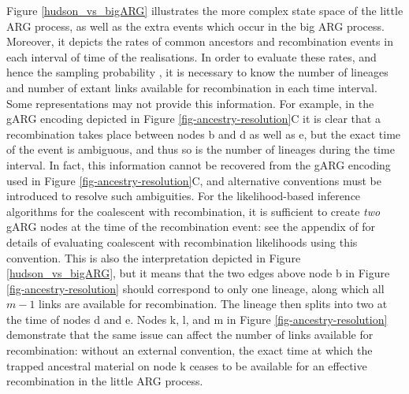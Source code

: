 \documentclass{article}
\newcommand{\noderef}[1]{\textsf{#1}}
\begin{document}
Figure \ref{hudson_vs_bigARG} illustrates the more complex state space
of the little ARG process, as well as the extra events which occur in the big ARG process.
Moreover, it depicts the rates of common ancestors and recombination events in each
interval of time of the realisations.
In order to evaluate these rates, and hence the sampling probability
\cite[see e.g.][Equation (3)]{mahmoudi2022bayesian},
it is necessary to know the number of lineages and number of extant links
available for recombination in each time interval.
Some representations may not provide this information.
For example, in the gARG encoding depicted in Figure \ref{fig-ancestry-resolution}C
it is clear that a recombination takes place between nodes \noderef{b} and
\noderef{d} as well as \noderef{e}, but the exact time of the event is ambiguous,
and thus so is the number of lineages during the time interval. In fact, this
information cannot be recovered from the gARG encoding used in Figure \ref{fig-ancestry-resolution}C,
and alternative conventions must be introduced to resolve such ambiguities.
For the likelihood-based inference algorithms for the coalescent with recombination,
it is sufficient to create \emph{two} gARG nodes at the time of the recombination event:
see the appendix of \cite{baumdicker2021efficient} for details of evaluating
coalescent with recombination likelihoods using this convention.
This is also the interpretation depicted in
Figure \ref{hudson_vs_bigARG}, but it means that the two edges above node \noderef{b}
in Figure \ref{fig-ancestry-resolution} should correspond to only one lineage,
along which all $m-1$ links are available for recombination.
The lineage then splits into two at the time of nodes \noderef{d} and \noderef{e}.
Nodes \noderef{k}, \noderef{l}, and \noderef{m} in Figure \ref{fig-ancestry-resolution}
demonstrate that the same issue can affect the number of links available for recombination:
without an external convention, the exact time at which the trapped ancestral material on
node \noderef{k} ceases to be available for an effective recombination in the little ARG process.
\end{document}
